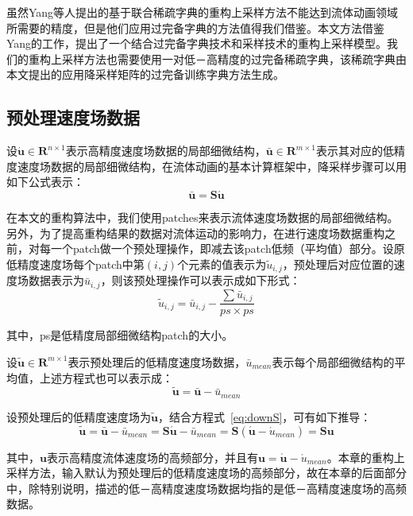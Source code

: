 虽然Yang等人提出的基于联合稀疏字典的重构上采样方法不能达到流体动画领域所需要的精度，但是他们应用过完备字典的方法值得我们借鉴。本文方法借鉴Yang的工作，提出了一个结合过完备字典技术和采样技术的重构上采样模型。我们的重构上采样方法也需要使用一对低－高精度的过完备稀疏字典，该稀疏字典由本文提出的应用降采样矩阵的过完备训练字典方法生成。

\subsection{预处理速度场数据}

设$\acute {\boldsymbol u} \in \boldsymbol R^{n \times 1}$表示高精度速度场数据的局部细微结构，$\bar {\boldsymbol u} \in \boldsymbol R^{m \times 1}$表示其对应的低精度速度场数据的局部细微结构，在流体动画的基本计算框架中，降采样步骤可以用如下公式表示：
\begin{equation}
\label{eq:downS}
\bar {\boldsymbol u} = \boldsymbol {S \acute u}
\end{equation}

在本文的重构算法中，我们使用patches来表示流体速度场数据的局部细微结构。另外，为了提高重构结果的数据对流体运动的影响力，在进行速度场数据重构之前，对每一个patch做一个预处理操作，即减去该patch低频（平均值）部分。设原低精度速度场每个patch中第$(i,j)$个元素的值表示为$\tilde u_{i, j} $，预处理后对应位置的速度场数据表示为$\bar u_{i,j}$，则该预处理操作可以表示成如下形式：
\begin{equation}
\tilde u_{i,j} = \bar u_{i,j} -  \frac{\sum  \bar u_{i,j}}{ps \times ps}
\end{equation}

其中，ps是低精度局部细微结构patch的大小。

设$\tilde {\boldsymbol u} \in \boldsymbol R^{m \times 1}$表示预处理后的低精度速度场数据，$\bar u_{mean}$表示每个局部细微结构的平均值，上述方程式也可以表示成：
\begin{equation}
\tilde {\boldsymbol u}= \bar {\boldsymbol u} - \bar u_{mean}
\end{equation}

设预处理后的低精度速度场为$\tilde {\boldsymbol u}$，结合方程式~\ref{eq:downS}，可有如下推导：
\begin{equation}
\label{eq:downSamp}
\tilde {\boldsymbol u} = \bar{\boldsymbol u} - \bar u_{mean}
= \boldsymbol S \acute{\boldsymbol u} - \bar u_{mean}
= \boldsymbol S(\acute{\boldsymbol u} - \acute u_{mean})
=  \boldsymbol {Su}
\end{equation}

其中，$\boldsymbol u$表示高精度流体速度场的高频部分，并且有$\boldsymbol u = \acute{\boldsymbol u} - \acute u_{mean}$。本章的重构上采样方法，输入默认为预处理后的低精度速度场的高频部分，故在本章的后面部分中，除特别说明，描述的低－高精度速度场数据均指的是低－高精度速度场的高频数据。

